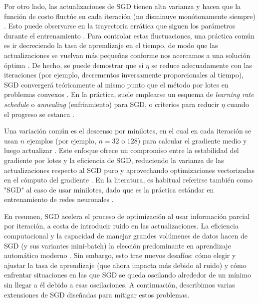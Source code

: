 \documentclass[12pt, spanish]{article}
\begin{document}
Por otro lado, las actualizaciones de SGD tienen alta varianza y hacen que la función de costo fluctúe en cada iteración (no disminuye monótonamente siempre) \cite{ref1}. Esto puede observarse en la trayectoria errática que siguen los parámetros durante el entrenamiento \cite{ref1}. Para controlar estas fluctuaciones, una práctica común es ir decreciendo la tasa de aprendizaje en el tiempo, de modo que las actualizaciones se vuelvan más pequeñas conforme nos acercamos a una solución óptima \cite{ref1}. De hecho, se puede demostrar que si $\eta$ se reduce adecuadamente con las iteraciones (por ejemplo, decrementos inversamente proporcionales al tiempo), SGD convergerá teóricamente al mismo punto que el método por lotes en problemas convexos \cite{ref1}. En la práctica, suele emplearse un esquema de \textit{learning rate schedule} o \textit{annealing} (enfriamiento) para SGD, o criterios para reducir $\eta$ cuando el progreso se estanca \cite{ref1}.

Una variación común es el descenso por minilotes, en el cual en cada iteración se usan $n$ ejemplos (por ejemplo, $n=32$ o $128$) para calcular el gradiente medio y luego actualizar \cite{ref1}. Este enfoque ofrece un compromiso entre la estabilidad del gradiente por lotes y la eficiencia de SGD, reduciendo la varianza de las actualizaciones respecto al SGD puro y aprovechando optimizaciones vectorizadas en el cómputo del gradiente \cite{ref1}. En la literatura, es habitual referirse también como "SGD" al caso de usar minilotes, dado que es la práctica estándar en entrenamiento de redes neuronales \cite{ref10}.

En resumen, SGD acelera el proceso de optimización al usar información parcial por iteración, a costa de introducir ruido en las actualizaciones. La eficiencia computacional y la capacidad de manejar grandes volúmenes de datos hacen de SGD (y sus variantes mini-batch) la elección predominante en aprendizaje automático moderno \cite{ref1}. Sin embargo, esto trae nuevos desafíos: cómo elegir y ajustar la tasa de aprendizaje (que ahora impacta más debido al ruido) y cómo enfrentar situaciones en las que SGD se queda oscilando alrededor de un mínimo sin llegar a él debido a esas oscilaciones. A continuación, describimos varias extensiones de SGD diseñadas para mitigar estos problemas.
\end{document}
